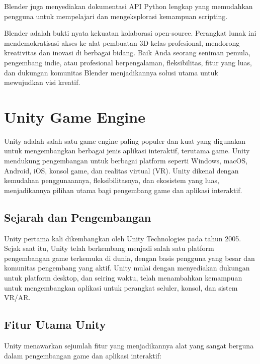 Blender juga menyediakan dokumentasi API Python lengkap yang memudahkan pengguna untuk mempelajari dan mengeksplorasi kemampuan scripting.

Blender adalah bukti nyata kekuatan kolaborasi open-source. Perangkat lunak ini mendemokratisasi akses ke alat pembuatan 3D kelas profesional, mendorong kreativitas dan inovasi di berbagai bidang. Baik Anda seorang seniman pemula, pengembang indie, atau profesional berpengalaman, fleksibilitas, fitur yang luas, dan dukungan komunitas Blender menjadikannya solusi utama untuk mewujudkan visi kreatif.


\section{Unity Game Engine}
\label{sec:unity}

Unity adalah salah satu game engine paling populer dan kuat yang digunakan untuk mengembangkan berbagai jenis aplikasi interaktif, terutama game. Unity mendukung pengembangan untuk berbagai platform seperti Windows, macOS, Android, iOS, konsol game, dan realitas virtual (VR). Unity dikenal dengan kemudahan penggunaannya, fleksibilitasnya, dan ekosistem yang luas, menjadikannya pilihan utama bagi pengembang game dan aplikasi interaktif.

\subsection{Sejarah dan Pengembangan}
Unity pertama kali dikembangkan oleh Unity Technologies pada tahun 2005. Sejak saat itu, Unity telah berkembang menjadi salah satu platform pengembangan game terkemuka di dunia, dengan basis pengguna yang besar dan komunitas pengembang yang aktif. Unity mulai dengan menyediakan dukungan untuk platform desktop, dan seiring waktu, telah menambahkan kemampuan untuk mengembangkan aplikasi untuk perangkat seluler, konsol, dan sistem VR/AR.

\subsection{Fitur Utama Unity}
\label{subsec:fitur_utama}

Unity menawarkan sejumlah fitur yang menjadikannya alat yang sangat berguna dalam pengembangan game dan aplikasi interaktif:

